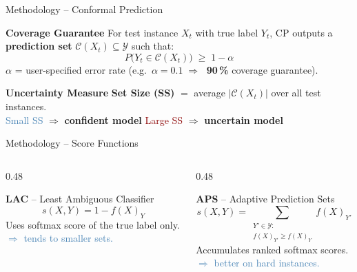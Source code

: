 \documentclass{beamer}
\begin{document}
\begin{frame}{Methodology -- Conformal Prediction}

\begin{block}{\textbf{Coverage Guarantee}}
  For test instance $X_t$ with true label $Y_t$, CP outputs a
  \textbf{prediction set} $\mathcal{C}(X_t)\subseteq\mathcal{Y}$ such that:
  $$P\!\bigl(Y_t \in \mathcal{C}(X_t)\bigr) \;\geq\; 1-\alpha$$
  $\alpha$ = user-specified error rate \quad
  (e.g.\ $\alpha=0.1 \;\Rightarrow\;$ \textbf{90\,\%} coverage guarantee).
\end{block}

\bigskip

\begin{block}{\textbf{Uncertainty Measure}}
  \textbf{Set Size (SS)} $=$ average $|\mathcal{C}(X_t)|$ over all test instances.\\[4pt]
  \hspace*{1em}
  \textcolor{steelblue}{Small SS} $\Rightarrow$ \textbf{confident model} \quad
  \textcolor{darkred}{Large SS} $\Rightarrow$ \textbf{uncertain model}
\end{block}

\end{frame}

\begin{frame}{Methodology -- Score Functions}

\begin{columns}[T]
  \begin{column}{0.48\textwidth}
    \begin{block}{\textbf{LAC} \small-- Least Ambiguous Classifier}
      $$s(X,Y)=1-f(X)_Y$$
      Uses softmax score of the true label only.\\[4pt]
      \textcolor{steelblue}{$\Rightarrow$ tends to smaller sets.}
    \end{block}
  \end{column}
  \begin{column}{0.48\textwidth}
    \begin{block}{\textbf{APS} \small-- Adaptive Prediction Sets}
      $$s(X,Y)=\!\sum_{\substack{Y'\in\mathcal{Y}:\\f(X)_{Y'}\geq f(X)_Y}}\!f(X)_{Y'}$$
      Accumulates ranked softmax scores.\\[4pt]
      \textcolor{steelblue}{$\Rightarrow$ better on hard instances.}
    \end{block}
  \end{column}
\end{columns}

\vspace{10pt}
\centering
{}

\end{frame}
\end{document}

